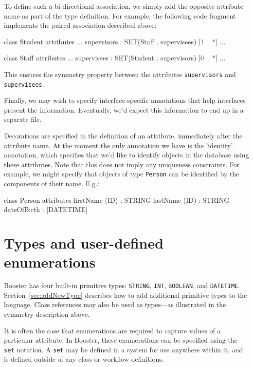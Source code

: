 To define such a bi-directional association, we simply add the
opposite attribute name as part of the type definition.  For example,
the following code fragment implements the paired association
described above:

\begin{code}
  class Student {
    attributes
      ...
      supervisors : SET(Staff . supervisees) [1 .. *]
      ...
  }

  class Staff {
    attributes
      ...
      supervisees : SET(Student . supervisors) [0 .. *]
      ...
  }
\end{code}

This ensures the symmetry property between the attributes
\verb|supervisors| and \verb|supervisees|.

Finally, we may wish to specify interface-specific annotations that
help interfaces present the information.  Eventually, we'd expect this
information to end up in a separate file.

Decorations are specified in the definition of an attribute,
immediately after the attribute name.  At the moment the only
annotation we have is the 'identity' annotation, which specifies that
we'd like to identify objects in the database using these attributes.
Note that this does not imply any uniqueness constraints.  For
example, we might specify that objects of type \verb|Person| can be
identified by the components of their name.  E.g.:

\begin{code}
class Person {
  attributes
    firstName (ID) : STRING
    lastName (ID) : STRING
    dateOfBirth : [DATETIME]
}
\end{code}

\section{Types and user-defined enumerations}

Booster has four built-in primitive types: \verb|STRING|, \verb|INT|,
\verb|BOOLEAN|, and \verb|DATETIME|.  Section~\ref{sec:addNewType}
describes how to add additional primitive types to the language.  
Class references may also be used as types---as illustrated in the
symmetry description above.

It is often the case that enumerations are required to capture values
of a particular attribute.  In Booster, these enumerations can be
specified using the \verb|set| notation.  A \verb|set| may be defined
in a system for use anywhere within it, and is defined outside of any
class or workflow definitions.

